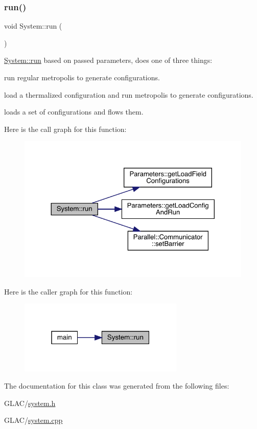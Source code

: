 \subsubsection{\texorpdfstring{run()}{run()}}
{\footnotesize\ttfamily void System\+::run (\begin{DoxyParamCaption}{ }\end{DoxyParamCaption})}



\mbox{\hyperlink{class_system_afa39feb75f96798930f4bfb48205f40b}{System\+::run}} based on passed parameters, does one of three things\+: 


\begin{DoxyItemize}
\item run regular metropolis to generate configurations.
\item load a thermalized configuration and run metropolis to generate configurations.
\item loads a set of configurations and flows them. 
\end{DoxyItemize}Here is the call graph for this function\+:
\nopagebreak
\begin{figure}[H]
\begin{center}
\leavevmode
\includegraphics[width=324pt]{class_system_afa39feb75f96798930f4bfb48205f40b_cgraph}
\end{center}
\end{figure}
Here is the caller graph for this function\+:
\nopagebreak
\begin{figure}[H]
\begin{center}
\leavevmode
\includegraphics[width=223pt]{class_system_afa39feb75f96798930f4bfb48205f40b_icgraph}
\end{center}
\end{figure}


The documentation for this class was generated from the following files\+:\begin{DoxyCompactItemize}
\item 
G\+L\+A\+C/\mbox{\hyperlink{system_8h}{system.\+h}}\item 
G\+L\+A\+C/\mbox{\hyperlink{system_8cpp}{system.\+cpp}}\end{DoxyCompactItemize}
